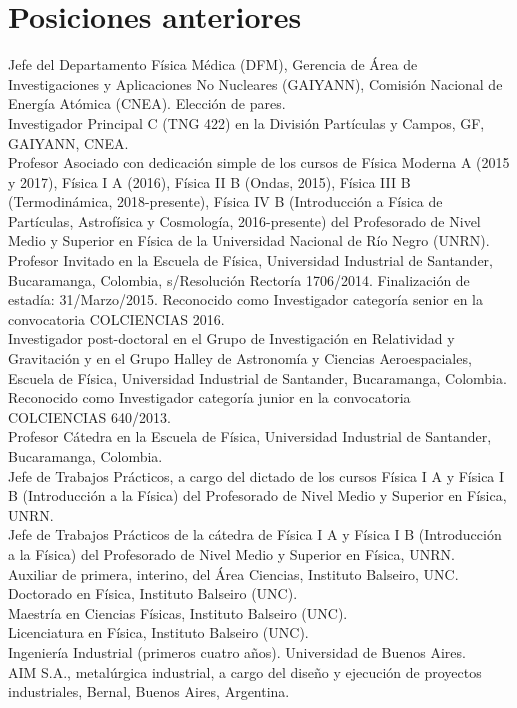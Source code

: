 \section*{Posiciones anteriores}
\noindent
{} Jefe del Departamento Física Médica (DFM), Gerencia de Área de Investigaciones y Aplicaciones No Nucleares (GAIYANN), Comisión Nacional de Energía Atómica (CNEA). Elección de pares.\\
 Investigador Principal C (TNG 422) en la División Partículas y Campos, GF, GAIYANN, CNEA.\\
 Profesor Asociado con dedicación simple de los cursos de Física Moderna A (2015 y 2017), Física I A (2016), Física II B (Ondas, 2015), Física III B (Termodinámica, 2018-presente), Física IV B (Introducción a Física de Partículas, Astrofísica y Cosmología, 2016-presente) del Profesorado de Nivel Medio y Superior en Física de la Universidad Nacional de Río Negro (UNRN).\\
 Profesor Invitado en la Escuela de Física, Universidad Industrial de Santander, Bucaramanga, Colombia, s/Resolución Rectoría 1706/2014. Finalización de estadía: 31/Marzo/2015. Reconocido como Investigador categoría senior en la convocatoria COLCIENCIAS 2016.\\
 Investigador post-doctoral en el Grupo de Investigación en Relatividad y Gravitación y en el Grupo Halley de Astronomía y Ciencias Aeroespaciales, Escuela de Física, Universidad Industrial de Santander, Bucaramanga, Colombia. Reconocido como Investigador categoría junior en la convocatoria COLCIENCIAS 640/2013.\\
 Profesor Cátedra en la Escuela de Física, Universidad Industrial de Santander, Bucaramanga, Colombia.\\
 Jefe de Trabajos Prácticos, a cargo del dictado de los cursos Física I A y Física I B (Introducción a la Física) del Profesorado de Nivel Medio y Superior en Física, UNRN.\\
 Jefe de Trabajos Prácticos de la cátedra de Física I A y Física I B (Introducción a la Física) del Profesorado de Nivel Medio y Superior en Física, UNRN.\\
 Auxiliar de primera, interino, del Área Ciencias, Instituto Balseiro, UNC.\\
 Doctorado en Física, Instituto Balseiro (UNC).\\
 Maestría en Ciencias Físicas, Instituto Balseiro (UNC).\\
 Licenciatura en Física, Instituto Balseiro (UNC).\\
 Ingeniería Industrial (primeros cuatro años). Universidad de Buenos Aires.\\
 AIM S.A., metalúrgica industrial, a cargo del diseño y ejecución de proyectos industriales, Bernal, Buenos Aires, Argentina.\\
\fi
\fi

